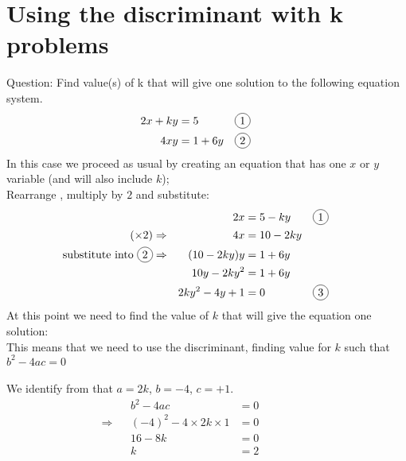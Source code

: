 \documentclass[a4paper,11pt]{article}
\newcommand*\circled[1]{\tikz[baseline=(char.base)]{
		\node[shape=circle,draw,inner sep=2pt] (char) {#1};}}
\begin{document}
\section{Using the discriminant with k problems}
Question: Find value(s) of k that will give one solution to the following equation system.
\begin{align*}
2x+ky&=5&\circled{1}&&&&&\\
4xy&=1+6y&\circled{2}&&&&&
\end{align*}
In this case we proceed as usual by creating an equation that has one $x$ or $y$ variable (and will also include $k$);\\
Rearrange \circled{1}, multiply by $2$ and substitute:
\begin{align*}
&&2x&=5-ky&\circled{1}&&&&&\\
(\times 2)\Rightarrow&& 4x&=10-2ky&&&&&&\\
\text{substitute into}~\circled{2}\Rightarrow&& (10-2ky)y&=1+6y&&&&&&\\
&& 10y-2ky^{2}&=1+6y&&&&&&\\
&& 2ky^{2}-4y+1&=0&\circled{3}&&&&&\\
\end{align*}
At this point we need to find the value of $k$ that will give the equation one solution:\\
This means that we need to use the discriminant, finding value for $k$ such that $b^{2}-4ac=0$\\\\
We identify from \circled{3} that $a=2k$, $b=-4$, $c=+1$.
\begin{align*}
&&b^{2}-4ac&=0&&&&&&\\
\Rightarrow&&(-4)^{2}-4\times 2k\times 1&=0&&&&&&\\
&&16-8k&=0&&&&&&\\
&&k&=2&&&&&&
\end{align*}
\end{document}
